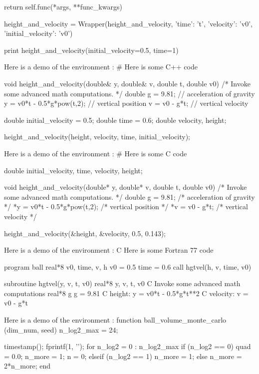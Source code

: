         return self.func(*args, **func_kwargs)

height_and_velocity = Wrapper(height_and_velocity,
      {'time': 't', 'velocity': 'v0', 'initial_velocity': 'v0'})

print height_and_velocity(initial_velocity=0.5, time=1)

\noindent
Here is a demo of the environment :
# Here is some C++ code

void height_and_velocity(double& y, double& v,
                         double t, double v0)
{
    /*
    Invoke some advanced math computations.
    */
    double g = 9.81;               // acceleration of gravity
    y = v0*t - 0.5*g*pow(t,2);     // vertical position
    v = v0 - g*t;                  // vertical velocity
}

double initial_velocity = 0.5;
double time = 0.6;
double velocity, height;

height_and_velocity(height, velocity, time, initial_velocity);

\noindent
Here is a demo of the environment :
# Here is some C code

double initial_velocity, time, velocity, height;

void height_and_velocity(double* y, double* v,
                         double t, double v0)
{
    /*
    Invoke some advanced math computations.
    */
    double g = 9.81;                /* acceleration of gravity */
    *y = v0*t - 0.5*g*pow(t,2);     /* vertical position */
    *v = v0 - g*t;                  /* vertical velocity */
}

height_and_velocity(&height, &velocity, 0.5, 0.143);

\noindent
Here is a demo of the environment :
C Here is some Fortran 77 code

       program ball
       real*8 v0, time, v, h
       v0 = 0.5
       time = 0.6
       call hgtvel(h, v, time, v0)

       subroutine hgtvel(y, v, t, v0)
       real*8 y, v, t, v0
C      Invoke some advanced math computations
       real*8 g
       g = 9.81
C      height:
       y = v0*t - 0.5*g*t**2
C      velocity:
       v = v0 - g*t

\noindent
Here is a demo of the environment :
function ball_volume_monte_carlo (dim_num, seed)
  n_log2_max = 24;

  timestamp();
  fprintf(1, '\n');
%
%
  for n_log2 = 0 : n_log2_max
    if (n_log2 == 0)
      quad = 0.0;
      n_more = 1;
      n = 0;
    elseif (n_log2 == 1)
      n_more = 1;
    else
      n_more = 2*n_more;
    end

